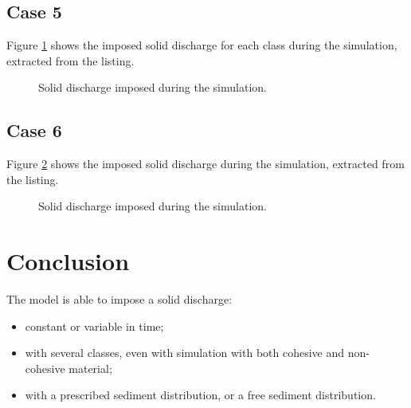 \subsection{Case 5}
%
Figure \ref{flumebc:discharge5} shows the imposed solid discharge for each class during the simulation, extracted from the listing.
%
\begin{figure}[H]
 \centering
 \caption{Solid discharge imposed during the simulation.}
 \label{flumebc:discharge5}
\end{figure}
%
\subsection{Case 6}
%
Figure \ref{flumebc:discharge6} shows the imposed solid discharge during the simulation, extracted from the listing.
%
\begin{figure}[H]
 \centering
 \caption{Solid discharge imposed during the simulation.}
 \label{flumebc:discharge6}
\end{figure}
%
\section{Conclusion}
%
The model is able to impose a solid discharge:
\begin{itemize}
\item constant or variable in time;
\item with several classes, even with simulation with both cohesive and non-cohesive material;
\item with a prescribed sediment distribution, or a free sediment distribution.
\end{itemize}

